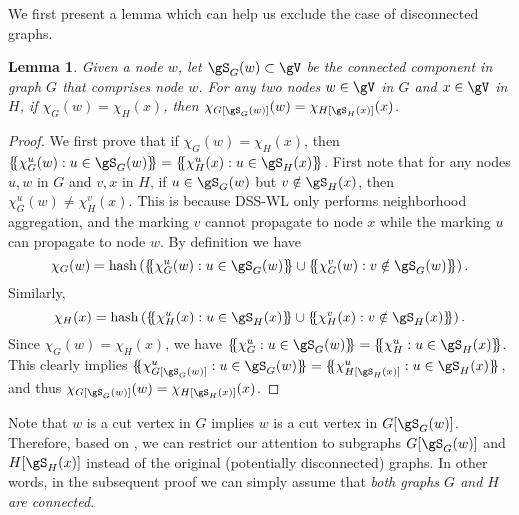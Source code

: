 \documentclass{article} %
\let\cref\crtcref
\newtheorem{lemma}[theorem]{Lemma}
\newcommand*{\ldblbrace}{\{\mskip-5mu\{}
\newcommand*{\rdblbrace}{\}\mskip-5mu\}}
\begin{document}
We first present a lemma which can help us exclude the case of disconnected graphs. 
\begin{lemma}
\label{thm:proof_dsswl_0}
Given a node $w$, let $\gS_G(w)\subset \gV$ be the connected component in graph $G$ that comprises node $w$. For any two nodes $w\in\gV$ in $G$ and $x\in\gV$ in $H$, if $\chi_G(w)=\chi_H(x)$, then $\chi_{G[\gS_G(w)]}(w)=\chi_{H[\gS_H(x)]}(x)$.
\end{lemma}
\begin{proof}
We first prove that if $\chi_G(w)=\chi_H(x)$, then $\ldblbrace \chi_G^u(w):u\in\gS_G(w)\rdblbrace=\ldblbrace \chi_H^u(x):u\in\gS_H(x)\rdblbrace$. First note that for any nodes $u,w$ in $G$ and $v,x$ in $H$, if $u\in\gS_G(w)$ but $v\notin\gS_H(x)$, then $\chi_G^{u}(w)\neq \chi_H^{v}(x)$. This is because DSS-WL only performs neighborhood aggregation, and the marking $v$ cannot propagate to node $x$ while the marking $u$ can propagate to node $w$. By definition we have $$\chi_G(w)=\operatorname{hash}\left(\ldblbrace \chi_G^u(w):u\in\gS_G(w)\rdblbrace \cup \ldblbrace \chi_G^v(w):v\notin\gS_G(w)\rdblbrace\right).$$
Similarly,$$\chi_H(x)=\operatorname{hash}\left(\ldblbrace \chi_H^u(x):u\in\gS_H(x)\rdblbrace \cup \ldblbrace \chi_H^v(x):v\notin\gS_H(x)\rdblbrace\right).$$
Since $\chi_G(w)=\chi_H(x)$, we have $\ldblbrace \chi_G^u:u\in\gS_G(w)\rdblbrace=\ldblbrace \chi_H^u:u\in\gS_H(x)\rdblbrace$. This clearly implies $\ldblbrace \chi_{G[\gS_G(w)]}^u:u\in\gS_G(w)\rdblbrace=\ldblbrace \chi_{H[\gS_H(x)]}^u:u\in\gS_H(x)\rdblbrace$, and thus $\chi_{G[\gS_G(w)]}(w)=\chi_{H[\gS_H(x)]}(x)$.
\end{proof}

Note that $w$ is a cut vertex in $G$ implies $w$ is a cut vertex in $G[\gS_G(w)]$. Therefore, based on \cref{thm:proof_dsswl_0}, we can restrict our attention to subgraphs $G[\gS_G(w)]$ and $H[\gS_H(x)]$ instead of the original (potentially disconnected) graphs. In other words, in the subsequent proof we can simply assume that \emph{both graphs $G$ and $H$ are connected}.
\end{document}
